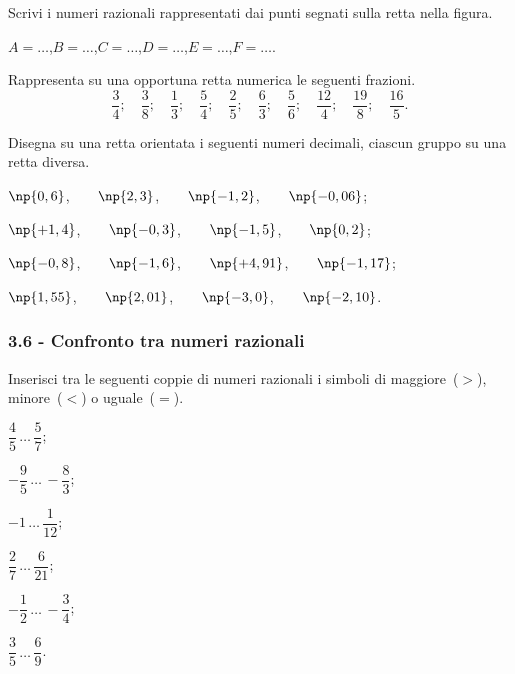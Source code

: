 \begin{esercizio}
 \label{ese:3.34}
 Scrivi i numeri razionali rappresentati dai punti segnati sulla retta nella figura.
\begin{center}

\end{center}
$ A=\ldots $,\quad $ B=\ldots $,\quad $ C=\ldots $,\quad $ D=\ldots $,\quad $ E=\ldots $,\quad $ F=\ldots $.

\end{esercizio}

\begin{esercizio}
 \label{ese:3.35}
Rappresenta su una opportuna retta numerica le seguenti frazioni.
\[\frac{3}{4};\quad\frac{3}{8};\quad\frac{1}{3};\quad\frac{5}{4};\quad\frac{2}{5};\quad\frac{6}{3};\quad\frac{5}{6};\quad%
\frac{12}{4};\quad\frac{19}{8};\quad\frac{16}{5}.\]
\end{esercizio}

\begin{esercizio}
 \label{ese:3.36}
Disegna su una retta orientata i seguenti numeri decimali, ciascun gruppo su una retta diversa.
\begin{enumeratea}
 \item $\np{0,6}$,$\qquad\np{2,3}$,$\qquad\np{-1,2}$,$\qquad\np{-0,06}$;
 \item $\np{+1,4}$,$\qquad\np{-0,3}$,$\qquad\np{-1,5}$,$\qquad\np{0,2}$;
 \item $\np{-0,8}$,$\qquad\np{-1,6}$,$\qquad\np{+4,91}$,$\qquad\np{-1,17}$;
 \item $\np{1,55}$,$\qquad\np{2,01}$,$\qquad\np{-3,0}$,$\qquad\np{-2,10}$.
\end{enumeratea}
\end{esercizio}
\pagebreak
\subsubsection*{3.6 - Confronto tra numeri razionali}

\begin{esercizio}
 \label{ese:3.37}
Inserisci tra le seguenti coppie di numeri razionali i simboli di maggiore~($>$), minore~($<$) o uguale~($=$).
\begin{multicols}{3}
\begin{enumeratea}
\spazielenx
 \item $\dfrac{4}{5}\,\ldots\,\dfrac{5}{7}$;
 \item $-\dfrac{9}{5}\,\ldots\,-\dfrac{8}{3}$;
 \item $-1\,\ldots\,\dfrac{1}{12}$;
 \item $\dfrac{2}{7}\,\ldots\,\dfrac{6}{21}$;
 \item $-\dfrac{1}{2}\,\ldots\,-\dfrac{3}{4}$;
 \item $\dfrac{3}{5}\,\ldots\,\dfrac{6}{9}$.
\end{enumeratea}
\end{multicols}
\end{esercizio}

